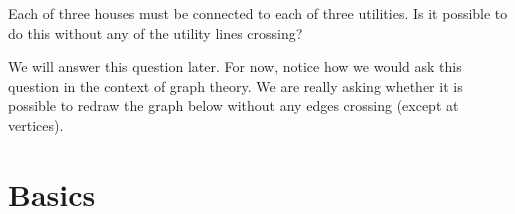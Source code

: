 \documentclass[12pt]{article}
\begin{document}
\begin{example}
  Each of three houses must be connected to each of three utilities.  Is it possible to do this without any of the utility lines crossing?
  \begin{solution}
    We will answer this question later.  For now, notice how we would ask this question in the context of graph theory.  We are really asking whether it is possible to redraw the graph below without any edges crossing (except at vertices).
    
    \begin{center}
    \end{center}

  \end{solution}

\end{example}

\section{Basics}
\end{document}
